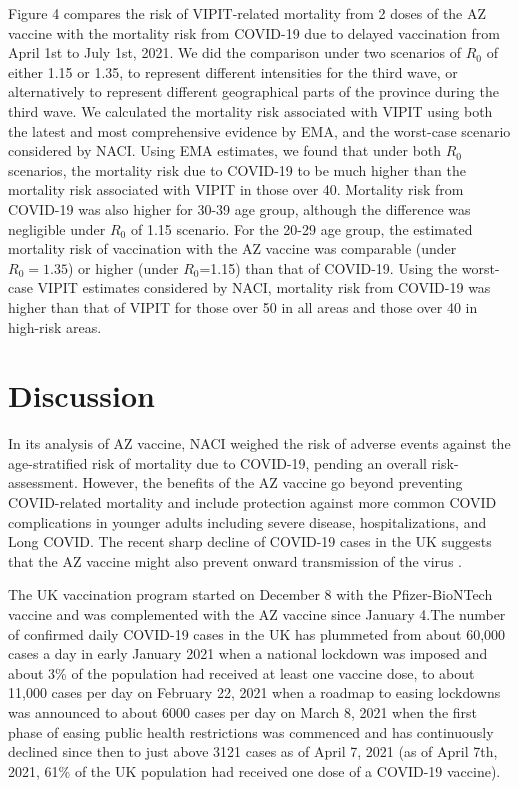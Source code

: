 \documentclass[]{interact}
\theoremstyle{plain}%
\theoremstyle{definition}
\theoremstyle{remark}
\begin{document}
Figure 4 compares the risk of VIPIT-related mortality from 2 doses of
the AZ vaccine with the mortality risk from COVID-19 due to delayed
vaccination from April 1st to July 1st, 2021. We did the comparison
under two scenarios of \(R_0\) of either 1.15 or 1.35, to represent
different intensities for the third wave, or alternatively to represent
different geographical parts of the province during the third wave. We
calculated the mortality risk associated with VIPIT using both the
latest and most comprehensive evidence by EMA, and the worst-case
scenario considered by NACI. Using EMA estimates, we found that under
both \(R_0\) scenarios, the mortality risk due to COVID-19 to be much
higher than the mortality risk associated with VIPIT in those over 40.
Mortality risk from COVID-19 was also higher for 30-39 age group,
although the difference was negligible under \(R_0\) of 1.15 scenario.
For the 20-29 age group, the estimated mortality risk of vaccination
with the AZ vaccine was comparable (under \(R_0=1.35\)) or higher (under
\(R_0\)=1.15) than that of COVID-19. Using the worst-case VIPIT
estimates considered by NACI, mortality risk from COVID-19 was higher
than that of VIPIT for those over 50 in all areas and those over 40 in
high-risk areas.

\hypertarget{discussion}{%
\section{Discussion}\label{discussion}}

In its analysis of AZ vaccine, NACI weighed the risk of adverse events
against the age-stratified risk of mortality due to COVID-19, pending an
overall risk-assessment. However, the benefits of the AZ vaccine go
beyond preventing COVID-related mortality and include protection against
more common COVID complications in younger adults including severe
disease, hospitalizations, and Long COVID. The recent sharp decline of
COVID-19 cases in the UK suggests that the AZ vaccine might also prevent
onward transmission of the virus
\citep{our_world_in_data_covid-19_2021}.

The UK vaccination program started on December 8 with the
Pfizer-BioNTech vaccine and was complemented with the AZ vaccine since
January 4.The number of confirmed daily COVID-19 cases in the UK has
plummeted from about 60,000 cases a day in early January 2021 when a
national lockdown was imposed and about 3\% of the population had
received at least one vaccine dose, to about 11,000 cases per day on
February 22, 2021 when a roadmap to easing lockdowns was announced to
about 6000 cases per day on March 8, 2021 when the first phase of easing
public health restrictions was commenced \citep{bbc_lockdown_2021} and
has continuously declined since then to just above 3121 cases as of
April 7, 2021 (as of April 7th, 2021, 61\% of the UK population had
received one dose of a COVID-19 vaccine).
\end{document}
